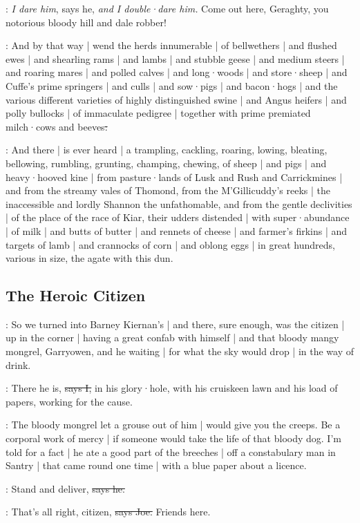 \Nq:
\emph{I dare him},
says he,
\emph{and I double·dare him.}
Come out here,
Geraghty,
you notorious bloody hill and dale robber!

:
And by that way |
wend the herds innumerable |
of bellwethers |
and flushed ewes |
and shearling rams |
and lambs |
and stubble geese |
and medium steers |
and roaring mares |
and polled calves |
and long·woods |
and store·sheep |
and Cuffe's prime springers |
and culls |
and sow·pigs |
and bacon·hogs |
and the various different varieties of highly distinguished swine |
and Angus heifers |
and polly bullocks |
of immaculate pedigree |
together with prime premiated milch·cows and beeves\sout{:}

:
And there |
is ever heard |
a trampling,
cackling,
roaring,
lowing,
bleating,
bellowing,
rumbling,
grunting,
champing,
chewing,
of sheep |
and pigs |
and heavy·hooved kine |
from pasture·lands of Lusk and Rush and Carrickmines |
and from the streamy vales of Thomond,
from the M'Gillicuddy's reeks |
the inaccessible and lordly Shannon the unfathomable,
and from the gentle declivities |
of the place of the race of Kiar,
their udders distended |
with super·abundance |
of milk |
and butts of butter |
and rennets of cheese |
and farmer's firkins |
and targets of lamb |
and crannocks of corn |
and oblong eggs |
in great hundreds,
various in size,
the agate with this dun.


\subsection*{The Heroic Citizen}

\Nq:
So we turned into Barney Kiernan's |
and there,
sure enough,
was the citizen |
up in the corner |
having a great confab with himself |
and that bloody mangy mongrel,
Garryowen,
and he waiting |
for what the sky would drop |
in the way of drink.

:
There he is,
\sout{says I,}
in his glory·hole,
with his cruiskeen lawn and his load of papers,
working for the cause.

\Nq:
The bloody mongrel let a grouse out of him |
would give you the creeps.
Be a corporal work of mercy |
if someone would take the life of that bloody dog.
I'm told for a fact |
he ate a good part of the breeches |
off a constabulary man in Santry |
that came round one time |
with a blue paper about a licence.

\citizen:
Stand and deliver,
\sout{says he.}

\joe:
That's all right,
citizen,
\sout{says Joe.}
Friends here.

